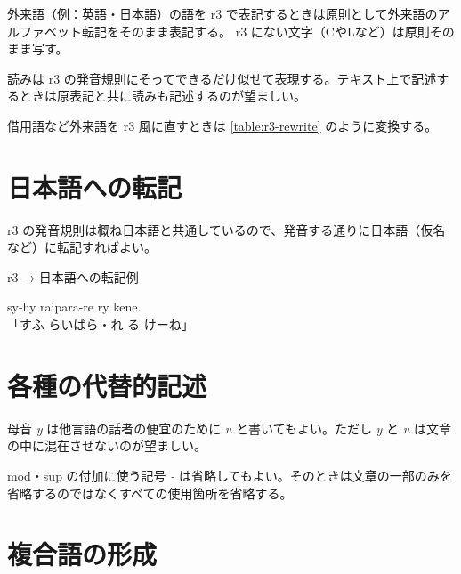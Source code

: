 外来語（例：英語・日本語）の語を r3 で表記するときは原則として外来語のアルファベット転記をそのまま表記する。
r3 にない文字（CやLなど）は原則そのまま写す。

読みは r3 の発音規則にそってできるだけ似せて表現する。テキスト上で記述するときは原表記と共に読みも記述するのが望ましい。

借用語など外来語を r3 風に直すときは \cref{table:r3-rewrite} のように変換する。

\section{日本語への転記}

r3 の発音規則は概ね日本語と共通しているので、発音する通りに日本語（仮名など）に転記すればよい。

\begin{itembox}[l]{r3 → 日本語への転記例}
    \begin{pindent}
        \noindent
        sy-hy raipara-re ry kene. \\
        「すふ らいぱら・れ る けーね」
    \end{pindent}
\end{itembox}

\section{各種の代替的記述}

母音 \emph{y} は他言語の話者の便宜のために \emph{u} と書いてもよい。ただし \emph{y} と \emph{u} は文章の中に混在させないのが望ましい。

mod・sup の付加に使う記号 \emph{-} は省略してもよい。そのときは文章の一部のみを省略するのではなくすべての使用箇所を省略する。

\section{複合語の形成}